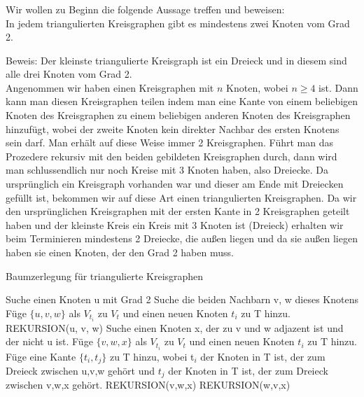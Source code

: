 \documentclass[a4paper]{article}
\begin{document}
	\subsubsection{}
	Wir wollen zu Beginn die folgende Aussage treffen und beweisen: \\
	In jedem triangulierten Kreisgraphen gibt es mindestens zwei Knoten vom Grad 2. \n
	
	Beweis:
	Der kleinste triangulierte Kreisgraph ist ein Dreieck und in diesem sind alle drei Knoten vom Grad 2. \\
	Angenommen wir haben einen Kreisgraphen mit $n$ Knoten, wobei $n \geq 4$ ist. Dann kann man diesen Kreisgraphen teilen indem man eine Kante von einem beliebigen Knoten des Kreisgraphen zu einem beliebigen anderen Knoten des Kreisgraphen hinzufügt, wobei der zweite Knoten kein direkter Nachbar des ersten Knotens sein darf. Man erhält auf diese Weise immer 2 Kreisgraphen. Führt man das Prozedere rekursiv mit den beiden gebildeten Kreisgraphen durch, dann wird man schlussendlich nur noch Kreise mit 3 Knoten haben, also Dreiecke. Da ursprünglich ein Kreisgraph vorhanden war und dieser am Ende mit Dreiecken gefüllt ist, bekommen wir auf diese Art einen triangulierten Kreisgraphen. Da wir den ursprünglichen Kreisgraphen mit der ersten Kante in 2 Kreisgraphen geteilt haben und der kleinste Kreis ein Kreis mit 3 Knoten ist (Dreieck) erhalten wir beim Terminieren mindestens 2 Dreiecke, die außen liegen und da sie außen liegen haben sie einen Knoten, der den Grad 2 haben muss. 
	
	
\begin{algorithm}
\caption{Baumzerlegung für triangulierte Kreisgraphen}
\begin{algorithmic}[1]
\State Suche einen Knoten u mit Grad 2
\State Suche die beiden Nachbarn v, w dieses Knotens
\State Füge $\{u,v,w\}$ als $V_{t_i}$ zu $V_t$ und einen neuen Knoten $t_i$ zu T hinzu.
\State REKURSION(u, v, w)
\EndProcedure
{}
\State Suche einen Knoten x, der zu v und w adjazent ist und der nicht u ist.
\State Füge $\{v,w,x\}$ als $V_{t_i}$ zu $V_t$ und einen neuen Knoten $t_i$ zu T hinzu.
\State Füge eine Kante $\{ t_i , t_j \}$ zu T hinzu, wobei t$_i$ der Knoten in T ist, der zum Dreieck zwischen u,v,w gehört und $t_j$ der Knoten in T ist, der zum Dreieck zwischen v,w,x gehört.
\State REKURSION(v,w,x)
\State REKURSION(w,v,x)
\EndIf
\EndProcedure
\end{algorithmic}
\end{algorithm}
\end{document}
